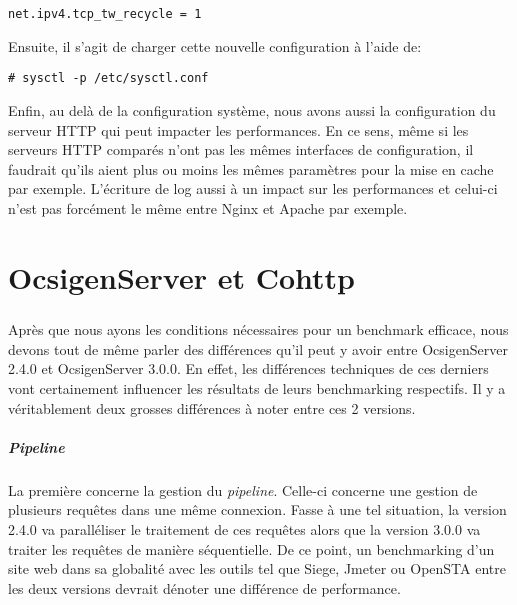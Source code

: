 \documentclass[a4paper, 11pt]{article}
\begin{document}
\begin{lstlisting}
net.ipv4.tcp_tw_recycle = 1
\end{lstlisting}

Ensuite, il s'agit de charger cette nouvelle configuration à l'aide de:

\begin{lstlisting}
# sysctl -p /etc/sysctl.conf
\end{lstlisting}

Enfin,  au delà de la configuration  système,  nous avons aussi la configuration
du serveur  HTTP qui peut impacter  les performances.  En ce  sens,  même si les
serveurs HTTP comparés  n'ont  pas  les  mêmes  interfaces de configuration,  il
faudrait qu'ils aient plus  ou moins les mêmes paramètres pour  la mise en cache
par exemple.  L'écriture de  log  aussi  à  un  impact  sur  les performances et
celui-ci n'est pas forcément le même entre Nginx et Apache par exemple.



\section{OcsigenServer et Cohttp}

\subparagraph{}
Après  que nous  ayons les  conditions nécessaires  pour un  benchmark efficace,
nous  devons tout  de même  parler des  différences  qu'il  peut  y  avoir entre
OcsigenServer  2.4.0  et   OcsigenServer  3.0.0.   En  effet,   les  différences
techniques de ces  derniers vont certainement influencer les  résultats de leurs
benchmarking respectifs.  Il y a véritablement  deux grosses différences à noter
entre ces 2 versions.

\subparagraph{Pipeline}
La  première  concerne la  gestion  du  \emph{pipeline}.  Celle-ci  concerne une
gestion  de  plusieurs  requêtes  dans  une  même  connexion.  Fasse  à  une tel
situation,  la version 2.4.0 va paralléliser le traitement de ces requêtes alors
que la  version 3.0.0 va traiter  les requêtes  de manière  séquentielle.  De ce
point,  un benchmarking d'un site web dans  sa globalité avec les outils tel que
Siege,  Jmeter ou OpenSTA entre les deux versions devrait dénoter une différence
de performance.
\end{document}

